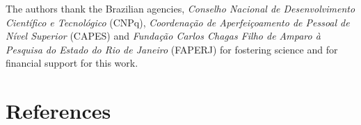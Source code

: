\documentclass[12pt]{CHT-20}
\begin{document}
The authors thank the Brazilian agencies, \textit{Conselho Nacional de Desenvolvimento Científico e Tecnológico} (CNPq), \textit{Coordenação de Aperfeiçoamento de Pessoal de Nível Superior} (CAPES) and \textit{Fundação Carlos Chagas Filho de Amparo à Pesquisa do Estado do Rio de Janeiro} (FAPERJ) for fostering science and for financial support for this work.

\section*{References}



 
\end{document}
